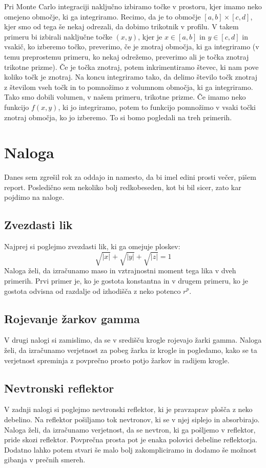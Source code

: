\documentclass[a4paper]{article}
\begin{document}
Pri Monte Carlo integraciji naključno izbiramo točke v prostoru, kjer imamo neko omejeno območje, ki ga integriramo.
Recimo, da je to območje $[a,b] \times [c,d]$, kjer smo od tega še nekaj odrezali, da dobimo trikotnik v profilu. V takem primeru 
bi izbirali naključne točke $(x,y)$, kjer je $x \in [a,b]$ in $y \in [c,d]$ in vsakič, ko izberemo točko, preverimo, če je
znotraj območja, ki ga integriramo (v temu preprostemu primeru, ko nekaj odrežemo, preverimo ali je točka znotraj trikotne prizme).
Če je točka znotraj, potem inkrimentiramo števec, ki nam pove koliko točk je znotraj. Na koncu integriramo tako, da delimo število
točk znotraj z številom vseh točk in to pomnožimo z volumnom območja, ki ga integriramo. Tako smo dobili volumen, v našem primeru,
trikotne prizme. Če imamo neko funkcijo $f(x,y)$, ki jo integriramo, potem to funkcijo pomnožimo v vsaki točki znotraj območja, ko 
jo izberemo. To si bomo pogledali na treh primerih. 

\section{Naloga}
Danes sem zgrešil rok za oddajo in namesto, da bi imel edini prosti večer, pišem report. Posledično sem nekoliko bolj redkobeseden,
kot bi bil sicer, zato kar pojdimo na naloge.

\subsection{Zvezdasti lik}
Najprej si poglejmo zvezdasti lik, ki ga omejuje ploskev:
\begin{equation}
    \sqrt{\vert x \vert} + \sqrt{\vert y \vert} + \sqrt{\vert z \vert} = 1
\end{equation}
Naloga želi, da izračunamo maso in vztrajnostni moment tega lika v dveh primerih. Prvi primer je, ko je gostota konstantna 
in v drugem primeru, ko je gostota odvisna od razdalje od izhodišča z neko potenco $r^p$.

\subsection{Rojevanje žarkov gamma}
V drugi nalogi si zamislimo, da se v središču krogle rojevajo žarki gamma. Naloga želi, da izračunamo verjetnost za pobeg žarka
iz krogle in pogledamo, kako se ta verjetnost spreminja z povprečno prosto potjo žarkov in radijem krogle.

\subsection{Nevtronski reflektor}
V zadnji nalogi si poglejmo nevtronski reflektor, ki je pravzaprav plošča z neko debelino. Na reflektor pošiljamo tok nevtronov, ki
se v njej siplejo in absorbirajo. Naloga želi, da izračunamo verjetnost, da se nevtron, ki ga pošljemo v reflektor, pride skozi 
reflektor. Povprečna prosta pot je enaka polovici debeline reflektorja. Dodatno lahko potem stvari še malo bolj zakompliciramo in
dodamo še možnost gibanja v prečnih smereh.
\end{document}
